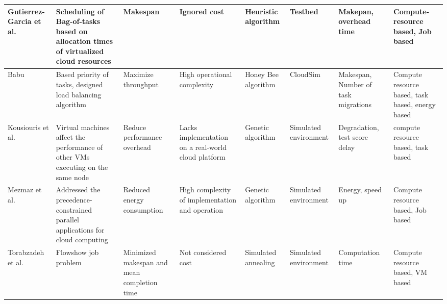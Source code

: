 \begin{table*}[!htbp]
{\begin{tabular}{|p{1.9cm} p{2cm} p{2cm} p{2cm} p{2cm} p{2cm} p{2cm} p{2cm}|}
Gutierrez-Garcia et al.~\cite{gutierrez2013family} & Scheduling of Bag-of-tasks based on allocation times of virtualized cloud resources & Makespan & Ignored cost & Heuristic algorithm &  Testbed & Makepan, overhead time & Compute-resource based, Job based
\\ \hline

Babu~\cite{ld2013honey} & Based  priority of tasks, designed load balancing algorithm & Maximize throughput & High operational complexity & Honey Bee algorithm & CloudSim & Makespan, Number of task migrations &  Compute resource based, task based, energy based
\\ \hline

Kousiouris et al.~\cite{kousiouris2011effects}& Virtual machines affect the performance of other VMs executing on the same node & Reduce performance overhead & Lacks implementation on a real-world cloud platform  & Genetic algorithm  &  Simulated environment & Degradation, test score delay &  compute resource based, task based
\\ \hline

Mezmaz et al.~\cite{mezmaz2011parallel} & Addressed the precedence-constrained parallel applications for cloud computing & Reduced energy consumption & High complexity of implementation and operation& Genetic algorithm & Simulated environment & Energy, speed up & Compute resource based, Job based
\\ \hline


Torabzadeh et al.~\cite{torabzadeh2010cloud} & Flowshow job problem  & Minimized makespan and mean completion time & Not considered cost & Simulated annealing & Simulated environment & Computation time & Compute resource based, VM based
\\ \hline


\end{tabular}
}

\end{table*}

